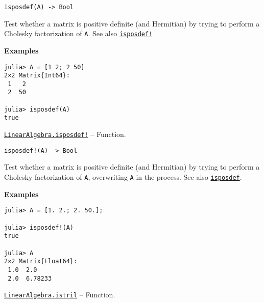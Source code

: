 \begin{adjustwidth}{2em}{0pt}


\begin{verbatim}
isposdef(A) -> Bool
\end{verbatim}

Test whether a matrix is positive definite (and Hermitian) by trying to perform a Cholesky factorization of \texttt{A}. See also \hyperlink{15124613555733932079}{\texttt{isposdef!}}

\textbf{Examples}


\begin{verbatim}
julia> A = [1 2; 2 50]
2×2 Matrix{Int64}:
 1   2
 2  50

julia> isposdef(A)
true
\end{verbatim}



\end{adjustwidth}
\hypertarget{15124613555733932079}{}
\hyperlink{15124613555733932079}{\texttt{LinearAlgebra.isposdef!}}  -- {Function.}

\begin{adjustwidth}{2em}{0pt}


\begin{verbatim}
isposdef!(A) -> Bool
\end{verbatim}

Test whether a matrix is positive definite (and Hermitian) by trying to perform a Cholesky factorization of \texttt{A}, overwriting \texttt{A} in the process. See also \hyperlink{13841568437070319804}{\texttt{isposdef}}.

\textbf{Examples}


\begin{verbatim}
julia> A = [1. 2.; 2. 50.];

julia> isposdef!(A)
true

julia> A
2×2 Matrix{Float64}:
 1.0  2.0
 2.0  6.78233
\end{verbatim}



\end{adjustwidth}
\hypertarget{14402064054856945387}{}
\hyperlink{14402064054856945387}{\texttt{LinearAlgebra.istril}}  -- {Function.}

